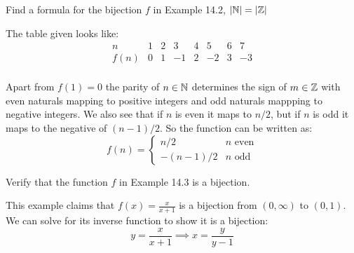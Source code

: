 \documentclass{article}
\begin{document}
\begin{problem}
Find a formula for the bijection $f$ in Example 14.2, $|\mathbb{N}| = |\mathbb{Z}|$
\end{problem}

The table given looks like:
$$
  \begin{array}{c|ccccccc}
    n    & 1 & 2 & 3  & 4 & 5  & 6 & 7  \\
    \hline
    f(n) & 0 & 1 & -1 & 2 & -2 & 3 & -3 \\
  \end{array}
$$

Apart from $f(1) = 0$ the parity of $n \in \mathbb{N}$ determines the sign of $m \in \mathbb{Z}$ with even naturals mapping to positive integers and odd naturals mappping to negative integers. We also see that if $n$ is even it maps to $n/2$, but if $n$ is odd it maps to the negative of $(n - 1) / 2$. So the function can be written as:
$$f(n) = \begin{cases}
    n/2          & n \text{ even} \\
    -(n - 1) / 2 & n \text { odd}
  \end{cases}$$

\begin{problem}
Verify that the function $f$ in Example 14.3 is a bijection.
\end{problem}

This example claims that $f(x) = \frac{x}{x + 1}$ is a bijection from $(0, \infty)$ to $(0, 1)$. We can solve for its inverse function to show it is a bijection:
$$y = \frac{x}{x + 1} \implies x = \frac{y}{y - 1}$$
\end{document}
